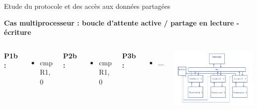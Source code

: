 \documentclass{beamer}
\begin{document}
\begin{frame}{Etude du protocole et des accès aux données partagées}
    \addtocounter{framenumber}{-1}
    \textbf{Cas multiprocesseur : boucle d’attente active / partage en lecture - \hspace*{3.8cm} écriture}
        \begin{columns}[c] %

        \textbf{P1b : }
        \begin{itemize}
            \item cmp R1, 0 
        \end{itemize}

        \textbf{P2b : }
        \begin{itemize}
            \item cmp R1, 0 
        \end{itemize}

        \textbf{P3b : }
        \begin{itemize}
            \item ...
        \end{itemize}

        \vspace{1cm}
        \includegraphics[scale=0.3]{archi.png}
        
    \end{columns}
\end{frame}
\end{document}
